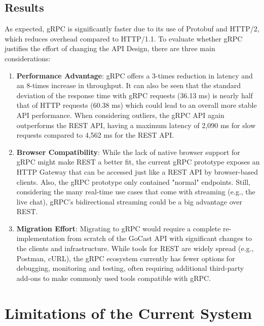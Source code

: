 \subsection{Results}

As expected, \ac{gRPC} is significantly faster due to its use of \ac{Protobuf} and HTTP/2, which reduces overhead compared to HTTP/1.1. To evaluate whether \ac{gRPC} justifies the effort of changing the \ac{API} Design, there are three main considerations:

\begin{enumerate}
    \item \textbf{Performance Advantage}: \ac{gRPC} offers a 3-times reduction in latency and an 8-times increase in throughput. It can also be seen that the standard deviation of the response time with \ac{gRPC} requests (36.13 ms) is nearly half that of HTTP requests (60.38 ms) which could lead to an overall more stable \ac{API} performance.  When considering outliers, the \ac{gRPC} \ac{API} again outperforms the \ac{REST} \ac{API}, having a maximum latency of 2,090 ms for slow requests compared to 4,562 ms for the \ac{REST} \ac{API}.

    \item \textbf{Browser Compatibility}: While the lack of native browser support for \ac{gRPC} might make \ac{REST} a better fit, the current \ac{gRPC} prototype exposes an HTTP Gateway that can be accessed just like a \ac{REST} \ac{API} by browser-based clients. Also, the \ac{gRPC} prototype only contained "normal" endpoints. Still, considering the many real-time use cases that come with streaming (e.g., the live chat), \ac{gRPC}’s bidirectional streaming could be a big advantage over \ac{REST}.

    \item \textbf{Migration Effort}: Migrating to \ac{gRPC} would require a complete re-implementation from scratch of the GoCast \ac{API} with significant changes to the clients and infrastructure. While tools for \ac{REST} are widely spread (e.g., Postman, cURL), the \ac{gRPC} ecosystem currently has fewer options for debugging, monitoring and testing, often requiring additional third-party add-ons to make commonly used tools compatible with \ac{gRPC}.
\end{enumerate}

\section{Limitations of the Current System}

